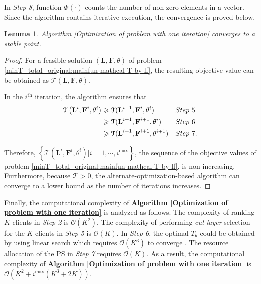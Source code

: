 \documentclass[10pt,journal,transmag]{IEEEtran}
\newtheorem{lemma}{Lemma}
\begin{document}
In \textit{Step 8}, function $\Phi(\cdot)$ counts the number of non-zero elements in a vector. Since the algorithm contains iterative execution, the convergence is proved below.


\begin{lemma}
    Algorithm \ref{Optimization of problem with one iteration} converges to a stable point.
\end{lemma}

\begin{proof}
    For a feasible solution $\left(\textbf{L}, \textbf{F}, \theta \right)$ of problem \eqref{minT_total_original:mainfun mathcal T by lf}, the resulting objective value can be obtained as $\mathcal{T} (\textbf{L},\textbf{F},\theta)$.
    
    In the $i^\text{th}$ iteration, the algorithm ensures that 
    \begin{align}
        \mathcal{T} \left(\textbf{L}^i,\textbf{F}^i,\theta^i\right) & \geqslant \mathcal{T} (\textbf{L}^{i+1},\textbf{F}^i,\theta^i) & Step\ 5 & \label{alternating minimization step 1 inequality}
        \\
        & \geqslant \mathcal{T} (\textbf{L}^{i+1},\textbf{F}^{i+1},\theta^{i}) & Step\ 6 & \label{alternating minimization step 2 inequality} \notag
        \\
        & \geqslant \mathcal{T} (\textbf{L}^{i+1},\textbf{F}^{i+1},\theta^{i+1}) & Step\ 7 & . \notag
    \end{align}
    
    Therefore, $\left\{\mathcal{T} (\textbf{L}^i,\textbf{F}^i,\theta^i)| i=1, \cdots, i^{\text{max}} \right\}$, the sequence of the objective values of problem \eqref{minT_total_original:mainfun mathcal T by lf}, is non-increasing.
    Furthermore, because $\mathcal{T}>0$, the alternate-optimization-based algorithm can converge to a lower bound as the number of iterations increases.
\end{proof}

Finally, the computational complexity of \textbf{Algorithm \ref{Optimization of problem with one iteration}} is analyzed as follows.
The complexity of ranking $K$ clients in \textit{Step 2} is $\mathcal{O}(K^2)$. The complexity of performing \textit{cut-layer} selection for the $K$ clients in \textit{Step 5} is $\mathcal{O}(K)$.
In \textit{Step 6}, the optimal $T_\theta$ could be obtained by using linear search which requires $\mathcal{O}(K^3)$ to converge \cite{Boyd2004ConvexO}. 
The resource allocation of the PS in \textit{Step 7} requires $\mathcal{O}(K)$.
As a result, the computational complexity of \textbf{Algorithm \ref{Optimization of problem with one iteration}} is $\mathcal{O}\left(K^2+ i^\text{max}(K^3 + 2K)\right)$.
\end{document}
